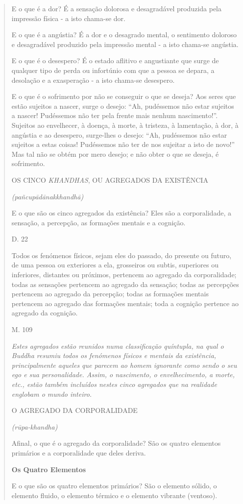 \begin{quote}
E o que é a dor? É a sensação dolorosa e desagradável produzida pela impressão física - a isto chama-se dor.

E o que é a angústia? É a dor e o desagrado mental, o sentimento doloroso e desagradável produzido pela impressão mental - a isto chama-se angústia.

E o que é o desespero? É o estado aflitivo e angustiante que surge de qualquer tipo de perda ou infortúnio com que a pessoa se depara, a desolação e a exasperação - a isto chama-se desespero.

E o que é o sofrimento por não se conseguir o que se deseja? Aos seres que estão sujeitos a nascer, surge o desejo: ``Ah, pudéssemos não estar sujeitos a nascer! Pudéssemos não ter pela frente mais nenhum nascimento!''. Sujeitos ao envelhecer, à doença, à morte, à tristeza, à lamentação, à dor, à angústia e ao desespero, surge-lhes o desejo: ``Ah, pudéssemos não estar sujeitos a estas coisas! Pudéssemos não ter de nos sujeitar a isto de novo!'' Mas tal não se obtém por mero desejo; e não obter o que se deseja, é sofrimento.

OS CINCO \emph{KHANDHAS}, OU AGREGADOS DA EXISTÊNCIA

\emph{(pañcupādānakkhandhā)}

E o que são os cinco agregados da existência? Eles são a corporalidade, a sensação, a percepção, as formações mentais e a cognição.

D. 22

Todos os fenómenos físicos, sejam eles do passado, do presente ou futuro, de uma pessoa ou exteriores a ela, grosseiros ou subtis, superiores ou inferiores, distantes ou próximos, pertencem ao agregado da corporalidade; todas as sensações pertencem ao agregado da sensação; todas as percepções pertencem ao agregado da percepção; todas as formações mentais pertencem ao agregado das formações mentais; toda a cognição pertence ao agregado da cognição.

M. 109

\emph{Estes agregados estão reunidos numa classificação quíntupla, na qual o Buddha resumiu todos os fenómenos físicos e mentais da existência, principalmente aqueles que parecem ao homem ignorante como sendo o seu ego e sua personalidade. Assim, o nascimento, o envelhecimento, a morte, etc., estão também incluídos nestes cinco agregados que na realidade englobam o mundo inteiro.}

O AGREGADO DA CORPORALIDADE

\emph{(rūpa-khandha)}

Afinal, o que é o agregado da corporalidade? São os quatro elementos primários e a corporalidade que deles deriva.

\textbf{Os Quatro Elementos}

E o que são os quatro elementos primários? São o elemento sólido, o elemento fluido, o elemento térmico e o elemento vibrante (ventoso).
\end{quote}

